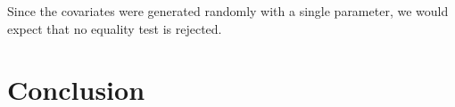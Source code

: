 \documentclass[english,nojss]{jss}\usepackage{graphicx, color}
\begin{document}
Since the covariates were generated randomly with a single parameter,
we would expect that no equality test is rejected. 


\section{Conclusion}



 
\end{document}
